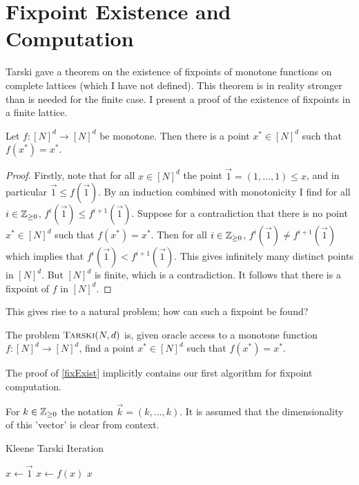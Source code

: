 \section{Fixpoint Existence and Computation}
Tarski gave a theorem on the existence of fixpoints of monotone functions on complete lattices\citep{tarski} (which I have not defined). This theorem
is in reality stronger than is needed for the finite case. I present a proof of the existence of fixpoints in a finite lattice.
\begin{theorem}\label{fixExist}
  Let $f : [N]^d \to [N]^d$ be monotone. Then there is a point $x^* \in [N]^d$ such that $f(x^*) = x^*$.
\end{theorem}
\begin{proof}
  Firstly, note that for all $x \in [N]^d$ the point $\vec{1} = (1, ..., 1) \leq x$, and in particular $\vec{1} \leq f(\vec{1})$.
  By an induction combined with monotonicity I find for all $i \in \mathbb{Z}_{\geq 0}$, $f^i (\vec{1}) \leq f^{i+1} (\vec{1})$. Suppose for a contradiction that there
  is no point $x^* \in [N]^d$ such that $f(x^*) = x^*$. Then for all $i \in \mathbb{Z}_{\geq 0}$, $f^i (\vec{1}) \neq f^{i+1}(\vec{1})$ which implies
  that $f^i (\vec{1}) < f^{i+1}(\vec{1})$. This gives infinitely many distinct points in $[N]^d$. But $[N]^d$ is finite, which is a contradiction.
  It follows that
  there is a fixpoint of $f$ in $[N]^d$.
\end{proof}
This gives rise to a natural problem; how can such a fixpoint be found?
\begin{definition}[$\trsk$]
  The problem $\textsc{Tarski}(N, d)$ is, given oracle access to a monotone function $f : [N]^d \to [N]^d$, find a point $x^* \in [N]^d$ such that $f(x^*) = x^*$.
\end{definition}
The proof of \cref{fixExist} implicitly contains our first algorithm for fixpoint computation.
\begin{notation}
  For $k \in \mathbb{Z}_{\geq 0}$ the notation $\vec{k} = (k, ..., k)$. It is assumed that
  the dimensionality of this 'vector' is clear from context.
\end{notation}
\begin{algorithm}
  \caption{Kleene Tarski Iteration}
  \begin{algorithmic}[1]\label{kleeneTarski}
  \State $x \gets \vec{1}$
    \State $x \gets f(x)$
  \EndWhile
  \Return $x$
  \EndProcedure
  \end{algorithmic}
\end{algorithm}

